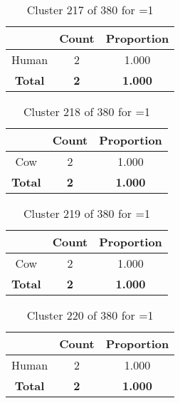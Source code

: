 \begin{table}[ht!]
\centering
\begin{tabular}{|c|c|c|}
\hline
\bf \Spec{} &\bf Count &\bf Proportion\\ \hline \hline
Human & 2 & 1.000\\ \hline
\hline
\bf Total & \bf 2 & \bf 1.000\\ \hline
\end{tabular}
\label{tab:cluster:217:1}
\caption{Cluster 217 of 380 for \minneigh{}=1}
\end{table}

\begin{table}[ht!]
\centering
\begin{tabular}{|c|c|c|}
\hline
\bf \Spec{} &\bf Count &\bf Proportion\\ \hline \hline
Cow & 2 & 1.000\\ \hline
\hline
\bf Total & \bf 2 & \bf 1.000\\ \hline
\end{tabular}
\label{tab:cluster:218:1}
\caption{Cluster 218 of 380 for \minneigh{}=1}
\end{table}

\begin{table}[ht!]
\centering
\begin{tabular}{|c|c|c|}
\hline
\bf \Spec{} &\bf Count &\bf Proportion\\ \hline \hline
Cow & 2 & 1.000\\ \hline
\hline
\bf Total & \bf 2 & \bf 1.000\\ \hline
\end{tabular}
\label{tab:cluster:219:1}
\caption{Cluster 219 of 380 for \minneigh{}=1}
\end{table}

\clearpage
\begin{table}[ht!]
\centering
\begin{tabular}{|c|c|c|}
\hline
\bf \Spec{} &\bf Count &\bf Proportion\\ \hline \hline
Human & 2 & 1.000\\ \hline
\hline
\bf Total & \bf 2 & \bf 1.000\\ \hline
\end{tabular}
\label{tab:cluster:220:1}
\caption{Cluster 220 of 380 for \minneigh{}=1}
\end{table}

